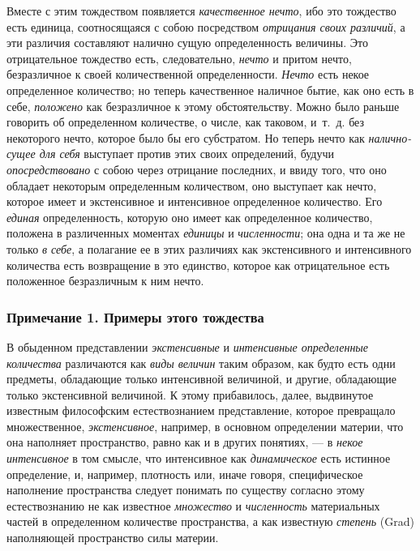 Вместе с этим тождеством появляется {\em качественное
нечто}, ибо это тождество есть единица, соотносящаяся с собою посредством
{\em отрицания своих различий}, а эти различия
составляют налично сущую определенность величины. Это отрицательное
тождество есть, следовательно, {\em нечто} и притом
нечто, безразличное к своей количественной определенности.
{\em Нечто} есть некое определенное количество; но
теперь качественное наличное бытие, как оно есть в себе,
{\em положено} как безразличное к этому обстоятельству.
Можно было раньше говорить об определенном количестве, о числе, как
таковом, и~т.~д. без некоторого нечто, которое было бы его субстратом. Но
теперь нечто как {\em налично-сущее для себя} выступает
против этих своих определений, будучи
{\em опосредствовано} с собою через отрицание
последних, и ввиду того, что оно обладает некоторым определенным
количеством, оно выступает как нечто, которое имеет и экстенсивное и
интенсивное определенное количество. Его {\em единая}
определенность, которую оно имеет как определенное количество, положена в
различенных моментах {\em единицы} и
{\em численности}; она одна и та же не только
{\em в себе}, а полагание ее в этих различиях как
экстенсивного и интенсивного количества есть возвращение в это единство,
которое как отрицательное есть положенное безразличным к ним нечто.


\subsubsection[Примечание 1. Примеры этого тождества]{Примечание 1. Примеры этого тождества}

В обыденном представлении {\em экстенсивные} и
{\em интенсивные определенные количества} различаются
как {\em виды величин} таким образом, как будто есть
одни предметы, обладающие только интенсивной величиной, и другие,
обладающие только экстенсивной величиной. К этому прибавилось, далее,
выдвинутое известным философским естествознанием представление, которое
превращало множественное, {\em экстенсивное}, например,
в основном определении материи, что она наполняет пространство, равно как и
в других понятиях, — в {\em некое интенсивное} в том
смысле, что интенсивное как {\em динамическое} есть
истинное определение, и, например, плотность или, иначе говоря,
специфическое наполнение пространства следует понимать по существу согласно
этому естествознанию не как известное {\em множество} и
{\em численность} материальных частей в определенном
количестве пространства, а как известную {\em степень}
(Grad) наполняющей пространство силы материи.

